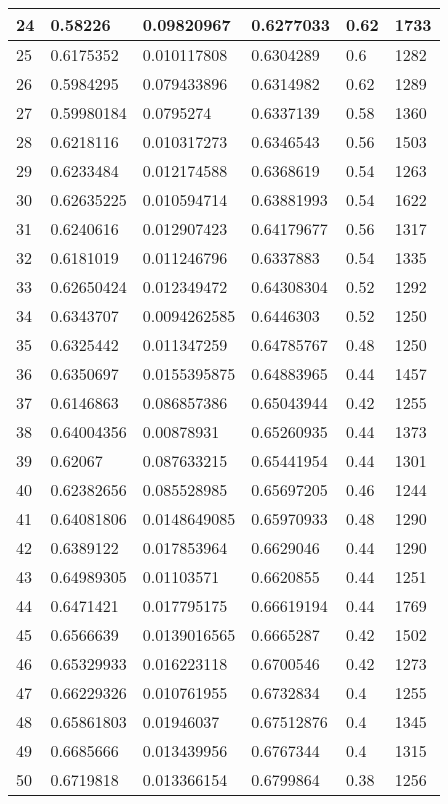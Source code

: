 \begin{longtable}{|l|l|l|l|l|l|}
24 & 0.58226 & 0.09820967 & 0.6277033 & 0.62 & 1733 \\ \hline 
25 & 0.6175352 & 0.010117808 & 0.6304289 & 0.6 & 1282 \\ \hline 
26 & 0.5984295 & 0.079433896 & 0.6314982 & 0.62 & 1289 \\ \hline 
27 & 0.59980184 & 0.0795274 & 0.6337139 & 0.58 & 1360 \\ \hline 
28 & 0.6218116 & 0.010317273 & 0.6346543 & 0.56 & 1503 \\ \hline 
29 & 0.6233484 & 0.012174588 & 0.6368619 & 0.54 & 1263 \\ \hline 
30 & 0.62635225 & 0.010594714 & 0.63881993 & 0.54 & 1622 \\ \hline 
31 & 0.6240616 & 0.012907423 & 0.64179677 & 0.56 & 1317 \\ \hline 
32 & 0.6181019 & 0.011246796 & 0.6337883 & 0.54 & 1335 \\ \hline 
33 & 0.62650424 & 0.012349472 & 0.64308304 & 0.52 & 1292 \\ \hline 
34 & 0.6343707 & 0.0094262585 & 0.6446303 & 0.52 & 1250 \\ \hline 
35 & 0.6325442 & 0.011347259 & 0.64785767 & 0.48 & 1250 \\ \hline 
36 & 0.6350697 & 0.0155395875 & 0.64883965 & 0.44 & 1457 \\ \hline 
37 & 0.6146863 & 0.086857386 & 0.65043944 & 0.42 & 1255 \\ \hline 
38 & 0.64004356 & 0.00878931 & 0.65260935 & 0.44 & 1373 \\ \hline 
39 & 0.62067 & 0.087633215 & 0.65441954 & 0.44 & 1301 \\ \hline 
40 & 0.62382656 & 0.085528985 & 0.65697205 & 0.46 & 1244 \\ \hline 
41 & 0.64081806 & 0.0148649085 & 0.65970933 & 0.48 & 1290 \\ \hline 
42 & 0.6389122 & 0.017853964 & 0.6629046 & 0.44 & 1290 \\ \hline 
43 & 0.64989305 & 0.01103571 & 0.6620855 & 0.44 & 1251 \\ \hline 
44 & 0.6471421 & 0.017795175 & 0.66619194 & 0.44 & 1769 \\ \hline 
45 & 0.6566639 & 0.0139016565 & 0.6665287 & 0.42 & 1502 \\ \hline 
46 & 0.65329933 & 0.016223118 & 0.6700546 & 0.42 & 1273 \\ \hline 
47 & 0.66229326 & 0.010761955 & 0.6732834 & 0.4 & 1255 \\ \hline 
48 & 0.65861803 & 0.01946037 & 0.67512876 & 0.4 & 1345 \\ \hline 
49 & 0.6685666 & 0.013439956 & 0.6767344 & 0.4 & 1315 \\ \hline 
50 & 0.6719818 & 0.013366154 & 0.6799864 & 0.38 & 1256 \\ \hline 
\end{longtable}